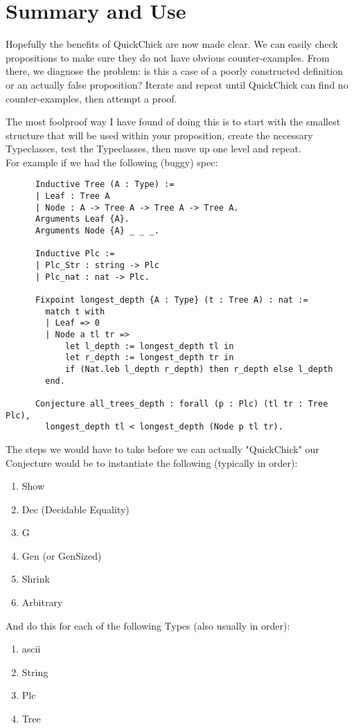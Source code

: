 \documentclass{article}
\begin{document}
  
    \section{Summary and Use}
    Hopefully the benefits of QuickChick are now made clear. 
    We can easily check propositions to make sure they do not have obvious counter-examples.
    From there, we diagnose the problem: is this a case of a poorly constructed definition or an actually false proposition? 
    Iterate and repeat until QuickChick can find no counter-examples, then attempt a proof.

    The most foolproof way I have found of doing this is to start with the smallest structure that will be used within your proposition, create the necessary Typeclasses, test the Typeclasses, then move up one level and repeat. \\
    For example if we had the following (buggy) spec:
    \begin{verbatim}     
      Inductive Tree (A : Type) :=
      | Leaf : Tree A 
      | Node : A -> Tree A -> Tree A -> Tree A.
      Arguments Leaf {A}.
      Arguments Node {A} _ _ _.

      Inductive Plc :=
      | Plc_Str : string -> Plc
      | Plc_nat : nat -> Plc.

      Fixpoint longest_depth {A : Type} (t : Tree A) : nat :=
        match t with
        | Leaf => 0
        | Node a tl tr => 
            let l_depth := longest_depth tl in
            let r_depth := longest_depth tr in
            if (Nat.leb l_depth r_depth) then r_depth else l_depth
        end.
      
      Conjecture all_trees_depth : forall (p : Plc) (tl tr : Tree Plc),
        longest_depth tl < longest_depth (Node p tl tr).
    \end{verbatim}
    The steps we would have to take before we can actually "QuickChick" our Conjecture would be to instantiate the following (typically in order): 
    \begin{enumerate}
      \item Show
      \item Dec (Decidable Equality)
      \item G
      \item Gen (or GenSized)
      \item Shrink
      \item Arbitrary
    \end{enumerate}
    And do this for each of the following Types (also usually in order):
    \begin{enumerate}
      \item ascii
      \item String
      \item Plc
      \item Tree
    \end{enumerate}
\end{document}
